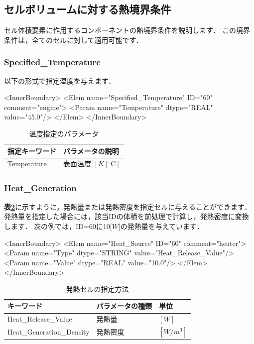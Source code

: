 \subsection{セルボリュームに対する熱境界条件}
セル体積要素に作用するコンポーネントの熱境界条件を説明します．
この境界条件は，全てのセルに対して適用可能です．

\subsubsection{Specified\_Temperature}

以下の形式で指定温度を与えます．
{\small
\begin{program}
<InnerBoundary>
  <Elem name="Specified_Temperature" ID="60" comment="engine">
    <Param name="Temperature" dtype="REAL" value="45.0"/>
  </Elem>
</InnerBoundary>
\end{program}
}

\begin{table}[htdp]
\caption{温度指定のパラメータ}
\begin{center}
\small
\begin{tabular}{ll} \toprule
指定キーワード & パラメータの説明\\ \midrule
Temperature & 表面温度 $[K\,|\,{}^\circ\mathrm{C}]$\\
\bottomrule
\end{tabular}
\end{center}
\label{tbl:spec temp}
\end{table}

%
\subsubsection{Heat\_Generation}
\textbf{表\ref{tbl:heat_generation}}に示すように，発熱量または発熱密度を指定セルに与えることができます．
発熱量を指定した場合には，該当IDの体積を前処理で計算し，発熱密度に変換します．
次の例では，ID=60に10[$W$]の発熱量を与えています．

{\small
\begin{program}
<InnerBoundary>
  <Elem name="Heat_Source" ID="60" comment="heater">
    <Param name="Type"    dtype="STRING" value="Heat_Release_Value"/>
    <Param name="Value"   dtype="REAL"   value="10.0"/>
  </Elem>
</InnerBoundary>
\end{program}
}

\begin{table}[htdp]
\caption{発熱セルの指定方法}
\begin{center}
\small
\begin{tabular}{lll} \toprule
キーワード & パラメータの種類 & 単位\\ \midrule
Heat\_Release\_Value & 発熱量 & $[W]$\\
Heat\_Generation\_Density & 発熱密度 & $[W/m^3]$\\ \bottomrule
\end{tabular}
\end{center}
\label{tbl:heat_generation}
\end{table}


